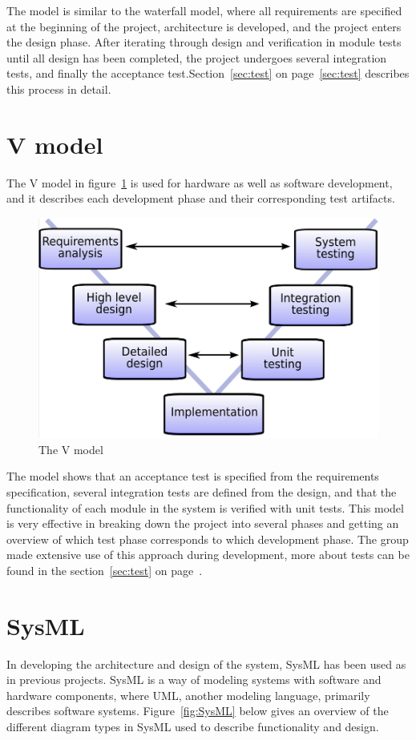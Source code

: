The model is similar to the waterfall model, where all requirements are specified at the beginning of the project, architecture is developed, and the project enters the design phase. After iterating through design and verification in module tests until all design has been completed, the project undergoes several integration tests, and finally the acceptance test.Section~\ref{sec:test} on page~\ref{sec:test} describes this process in detail.

\section{V model}
The V model in figure~\ref{fig:V_model} is used for hardware as well as software development, and it describes each development phase and their corresponding test artifacts. 

\begin{figure}[H]
	\centering
	\includegraphics[max width=0.7\linewidth]{V_model.png}
	\caption{The V model\cite{V_model}}
	\label{fig:V_model}
\end{figure}

The model shows that an acceptance test is specified from the requirements specification, several integration tests are defined from the design, and that the functionality of each module in the system is verified with unit tests. This model is very effective in breaking down the project into several phases and getting an overview of which test phase corresponds to which development phase. The group made extensive use of this approach during development, more about tests can be found in the section~\ref{sec:test} on page~\pageref{sec:test}.

\section{SysML}

In developing the architecture and design of the system, SysML has been used as in previous projects. SysML is a way of modeling systems with software and hardware components, where UML, another modeling language, primarily describes software systems. Figure~\ref{fig:SysML} below gives an overview of the different diagram types in SysML used to describe functionality and design.


